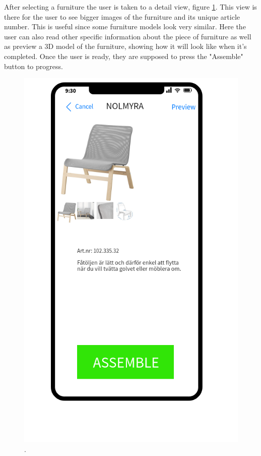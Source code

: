 After selecting a furniture the user is taken to a detail view, figure \ref{fig:detal-view}. This view is there for the user to see bigger images of the furniture and its unique article number. This is useful since some furniture models look very similar. Here the user can also read other specific information about the piece of furniture as well as preview a 3D model of the furniture, showing how it will look like when it's completed. Once the user is ready, they are supposed to press the "Assemble" button to progress.
 
\begin{figure}[hbtp]
\begin{center}
\includegraphics[height = 0.4\textheight]{./Images/Detail_view.png}
\caption{.}
\label{fig:detal-view}
\end{center}
\end{figure}


